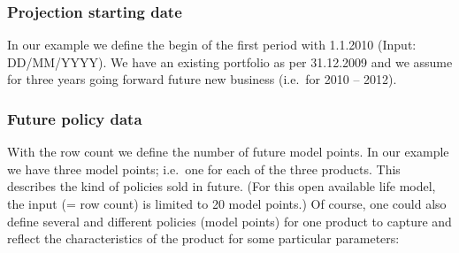 \subsubsection{Projection starting date}

In our example we define the begin of the first period with 1.1.2010 (Input: DD/MM/YYYY). We have an existing portfolio as per 31.12.2009 and we assume for three years going forward future new business (i.e.~for 2010 -- 2012).

\subsubsection{Future policy data}

With the row count we define the number of future model points. In our example we have three model points; i.e.~one for each of the three products. This describes the kind of policies sold in future. (For this open available life model, the input (= row count) is limited to 20 model points.) Of course, one could also define several and different policies (model points) for one product to capture and reflect the characteristics of the product for some particular parameters:

